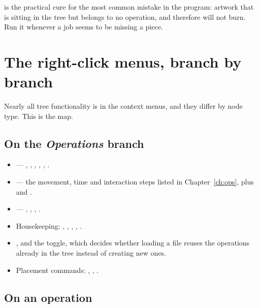 \begin{tipbox}
 is the practical cure for the most common
mistake in the program: artwork that is sitting in the tree but belongs to no
operation, and therefore will not burn. Run it whenever a job seems to be missing
a piece.
\end{tipbox}

\section{The right-click menus, branch by branch}

Nearly all tree functionality is in the context menus, and they differ by node
type. This is the map.

\subsection*{On the \emph{Operations} branch}

\begin{itemize}
  \item {} --- , ,
        , , ,
        .
  \item {} --- the movement, time and interaction
        steps listed in Chapter~\ref{ch:ops}, plus  and
        .
  \item {} --- ,
        , ,
        .
  \item Housekeeping: , ,
        , ,
        .
  \item {},  and the
         toggle, which decides whether loading a file reuses
        the operations already in the tree instead of creating new ones.
  \item Placement commands: ,
        , .
\end{itemize}

\subsection*{On an operation}

